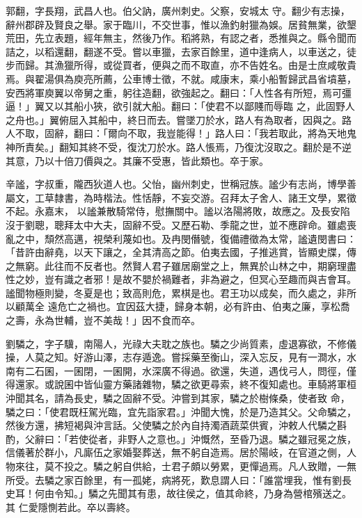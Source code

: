 \begin{pinyinscope}
 郭翻，字長翔，武昌人也。伯父訥，廣州刺史。父察，安城太
 守。翻少有志操，辭州郡辟及賢良之舉。家于臨川，不交世事，惟以漁釣射獵為娛。居貧無業，欲墾荒田，先立表題，經年無主，然後乃作。稻將熟，有認之者，悉推與之。縣令聞而詰之，以稻還翻，翻遂不受。嘗以車獵，去家百餘里，道中逢病人，以車送之，徒步而歸。其漁獵所得，或從買者，便與之而不取直，亦不告姓名。由是士庶咸敬貴焉。與翟湯俱為庾亮所薦，公車博士徵，不就。咸康末，乘小船暫歸武昌省墳墓，安西將軍庾翼以帝舅之重，躬往造翻，欲強起之。翻曰：「人性各有所短，焉可彊逼！」翼又以其船小狹，欲引就大船。翻曰：「使君不以鄙賤而辱臨
 之，此固野人之舟也。」翼俯屈入其船中，終日而去。嘗墜刀於水，路人有為取者，因與之。路人不取，固辭，翻曰：「爾向不取，我豈能得！」路人曰：「我若取此，將為天地鬼神所責矣。」翻知其終不受，復沈刀於水。路人悵焉，乃復沈沒取之。翻於是不逆其意，乃以十倍刀價與之。其廉不受惠，皆此類也。卒于家。



 辛謐，字叔重，隴西狄道人也。父怡，幽州刺史，世稱冠族。謐少有志尚，博學善屬文，工草隸書，為時楷法。性恬靜，不妄交游。召拜太子舍人、諸王文學，累徵不起。永嘉末，
 以謐兼散騎常侍，慰撫關中。謐以洛陽將敗，故應之。及長安陷沒于劉聰，聰拜太中大夫，固辭不受。又歷石勒、季龍之世，並不應辟命。雖處喪亂之中，頹然高邁，視榮利蔑如也。及冉閔僭號，復備禮徵為太常，謐遺閔書曰：「昔許由辭堯，以天下讓之，全其清高之節。伯夷去國，子推逃賞，皆顯史牒，傳之無窮。此往而不反者也。然賢人君子雖居廟堂之上，無異於山林之中，期窮理盡性之妙，豈有識之者邪！是故不嬰於禍難者，非為避之，但冥心至趣而與吉會耳。謐聞物極則變，冬夏是也；致高則危，累棋是也。君王功以成矣，而久處之，非所以顧萬全
 遠危亡之禍也。宜因茲大捷，歸身本朝，必有許由、伯夷之廉，享松喬之壽，永為世輔，豈不美哉！」因不食而卒。



 劉驎之，字子驥，南陽人，光祿大夫耽之族也。驎之少尚質素，虛退寡欲，不修儀操，人莫之知。好游山澤，志存遁逸。嘗採藥至衡山，深入忘反，見有一澗水，水南有二石囷，一囷閉，一囷開，水深廣不得過。欲還，失道，遇伐弓人，問徑，僅得還家。或說囷中皆仙靈方藥諸雜物，驎之欲更尋索，終不復知處也。車騎將軍桓沖聞其名，請為長史，驎之固辭不受。沖嘗到其家，驎之於樹條桑，使者致
 命，驎之曰：「使君既枉駕光臨，宜先詣家君。」沖聞大愧，於是乃造其父。父命驎之，然後方還，拂短褐與沖言話。父使驎之於內自持濁酒蔬菜供賓，沖敕人代驎之斟酌，父辭曰：「若使從者，非野人之意也。」沖慨然，至昏乃退。驎之雖冠冕之族，信儀著於群小，凡廝伍之家婚娶葬送，無不躬自造焉。居於陽岐，在官道之側，人物來往，莫不投之。驎之躬自供給，士君子頗以勞累，更憚過焉。凡人致贈，一無所受。去驎之家百餘里，有一孤姥，病將死，歎息謂人曰：「誰當埋我，惟有劉長史耳！何由令知。」驎之先聞其有患，故往侯之，值其命終，乃身為營棺殯送之。其
 仁愛隱惻若此。卒以壽終。




\end{pinyinscope}
